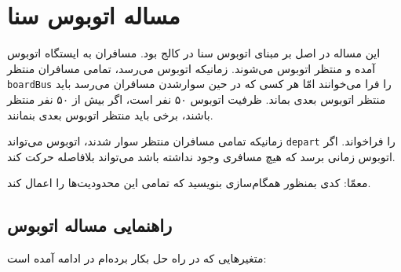 \documentclass{book}
\newcommand{\clearemptydoublepage}{\newpage\cleardoublepage}
\begin{document}
    

\clearemptydoublepage
\section{مساله اتوبوس سنا\footnotemark}

    این مساله در اصل بر مبنای اتوبوس سنا در کالج  بود.
    مسافران به ایستگاه اتوبوس آمده و منتظر اتوبوس می‌شوند. زمانیکه اتوبوس می‌رسد، تمامی مسافران منتظر    {\tt boardBus} را فرا می‌خوانند امّا 
    هر کسی که در حین سوارشدن مسافران می‌رسد باید منتظر اتوبوس بعدی بماند. ظرفیت اتوبوس ۵۰ نفر است، اگر بیش از ۵۰ نفر منتظر باشند، 
    برخی باید منتظر اتوبوس بعدی بنمانند. 

    زمانیکه تمامی مسافران منتظر سوار شدند، اتوبوس می‌تواند  {\tt depart} را فراخواند. 
    اگر اتوبوس زمانی برسد که هیچ مسافری وجود نداشته باشد می‌تواند بلافاصله  حرکت کند. 

    معمّا: کدی بمنظور همگام‌سازی بنویسید که تمامی این محدودیت‌ها را اعمال کند. 


\clearemptydoublepage
\subsection {راهنمایی مساله اتوبوس}

    متغیرهایی که در راه حل بکار برده‌ام در ادامه آمده است: 
\end{document}
